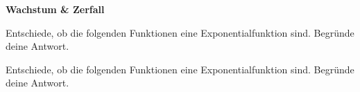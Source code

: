\documentclass[11pt]{exam}
\newcommand{\theme}{Wachstum \& Zerfall}
\begin{document}
\fontsize{14}{14}\selectfont
\begin{center}
    \huge\bf\theme
\end{center}

\begin{questions}
\question[3]
Entschiede, ob die folgenden Funktionen eine Exponentialfunktion sind. Begründe deine Antwort.

\question[3]
Entschiede, ob die folgenden Funktionen eine Exponentialfunktion sind. Begründe deine Antwort.
\end{questions}
\end{document}
